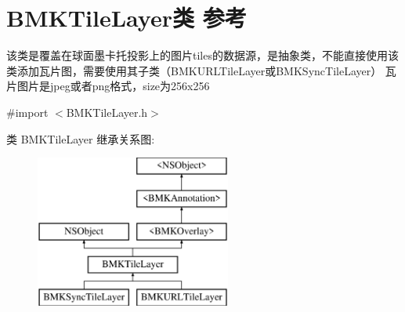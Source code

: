 \hypertarget{interface_b_m_k_tile_layer}{}\section{B\+M\+K\+Tile\+Layer类 参考}
\label{interface_b_m_k_tile_layer}


该类是覆盖在球面墨卡托投影上的图片tiles的数据源，是抽象类，不能直接使用该类添加瓦片图，需要使用其子类（\+B\+M\+K\+U\+R\+L\+Tile\+Layer或\+B\+M\+K\+Sync\+Tile\+Layer） 瓦片图片是jpeg或者png格式，size为256x256  




{\ttfamily \#import $<$B\+M\+K\+Tile\+Layer.\+h$>$}

类 B\+M\+K\+Tile\+Layer 继承关系图\+:\begin{figure}[H]
\begin{center}
\leavevmode
\includegraphics[height=5.000000cm]{interface_b_m_k_tile_layer}
\end{center}
\end{figure}
